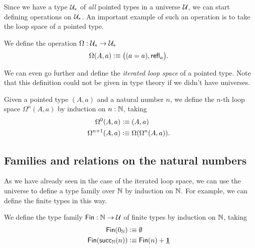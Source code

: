 Since we have a type $\mathcal{U}_\ast$ of \emph{all} pointed types in a universe $\mathcal{U}$, we can start defining operations on $\mathcal{U}_\ast$. An important example of such an operation is to take the loop space of a pointed type.

\begin{defn}
  We define the  operation $\Omega : \mathcal{U}_\ast \to \mathcal{U}_\ast$
  \begin{equation*}
    \Omega(A,a)\vcentcolon\equiv \big((a=a),\mathsf{refl}_{a}\big).
  \end{equation*}
\end{defn}

We can even go further and define the \emph{iterated loop space} of a pointed type. Note that this definition could not be given in type theory if we didn't have universes.

\begin{defn}
  Given a pointed type $(A,a)$ and a natural number $n$, we define the $n$-th loop space $\Omega^n(A,a)$ by induction on $n:{\mathbb{N}}$, taking
  \begin{align*}
    \Omega^0(A,a) & \vcentcolon\equiv (A,a) \\
    \Omega^{n+1}(A,a) & \vcentcolon\equiv \Omega(\Omega^n(A,a)).
  \end{align*}
\end{defn}

\subsection{Families and relations on the natural numbers}

As we have already seen in the case of the iterated loop space, we can use the universe to define a type family over ${\mathbb{N}}$ by induction on ${\mathbb{N}}$. For example, we can define the finite types in this way.

\begin{defn}\label{defn:fin}
We define the type family $\mathsf{Fin}:{\mathbb{N}}\to\mathcal{U}$ of finite types by induction on ${\mathbb{N}}$, taking
\begin{align*}
\mathsf{Fin}(0_{{\mathbb{N}}}) & \vcentcolon\equiv \emptyset \\
\mathsf{Fin}(\mathsf{succ}_{{\mathbb{N}}}(n)) & \vcentcolon\equiv \mathsf{Fin}(n)+\underline{\mathbf{1}}
\end{align*}
\end{defn}

